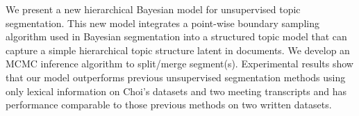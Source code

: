 We present a new hierarchical Bayesian model for unsupervised topic segmentation. This new model integrates a point-wise boundary sampling
 algorithm used in Bayesian segmentation into a structured topic model that can
 capture a simple hierarchical topic structure latent in documents. We develop
 an MCMC inference algorithm to split/merge segment(s). Experimental results
 show  that our model outperforms previous unsupervised segmentation methods
 using only lexical information on Choi's datasets and two meeting transcripts
 and has performance comparable to those  previous methods on two written
 datasets.

